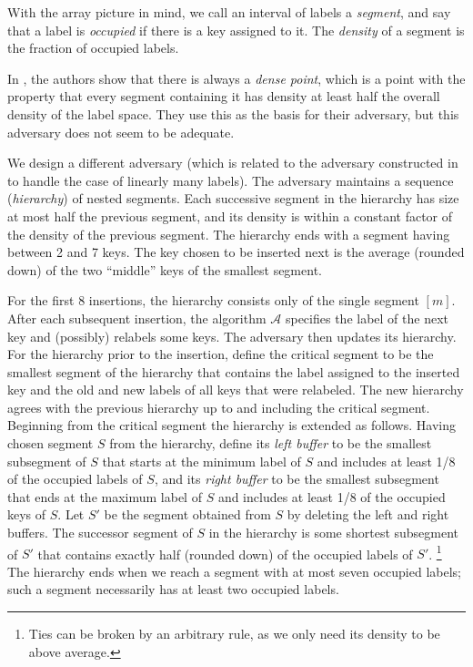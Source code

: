 \documentclass[11pt]{article}
\newcommand{\A}{\mathcal{A}}
\begin{document}
With the array picture in mind,
we  call an interval of labels a \emph{segment}, and say that a label is {\em occupied} if there is a key assigned to it.
The \emph{density} of a segment is the fraction of occupied labels.

In \cite{DSZ04}, the authors show that there is always a \emph{dense point}, which is
a point  with the property that every segment containing it
has density at least half the overall density of the label space.  They use this as the basis for their
adversary, but this adversary does not seem to be adequate.

We design a different adversary (which is related to the adversary constructed in \cite{BKS} to handle
the case of linearly many labels).
The adversary maintains a sequence (\emph{hierarchy}) of nested segments.  Each successive segment in the hierarchy
has size at most half the previous segment, and its density  is within a constant factor of the density of the previous segment.
The hierarchy ends with a segment having between 2 and 7 keys.
 The key chosen to be inserted next is the average (rounded down) of the two ``middle'' keys of the smallest segment.

For the first 8 insertions, the hierarchy consists only of the single segment $[m]$.
After each subsequent insertion,
the algorithm $\A$ specifies the label of the next key and (possibly) relabels some keys. The adversary then updates
its hierarchy.  For the hierarchy prior to the insertion, define the critical segment to be the smallest segment
of the hierarchy that contains the label assigned to the inserted key and the old and new labels
of all keys that were relabeled.  The new hierarchy agrees with the previous hierarchy up to and including
the critical segment.   Beginning from the critical segment the hierarchy is extended as follows.
Having chosen segment $S$ from the hierarchy, define its
{\em left buffer}
to be the smallest subsegment of $S$ that starts at the minimum label of $S$ and
includes at least 1/8 of the occupied labels of $S$, and its {\em right buffer} to be the smallest subsegment that ends at the maximum label of $S$
and includes at least 1/8 of the occupied keys of $S$.
Let $S'$ be the segment obtained from $S$ by
deleting the left and right buffers. The successor segment of $S$ in the hierarchy is
some shortest subsegment of $S'$ that contains exactly half (rounded down) of the occupied labels of $S'$.%
\footnote{Ties can be broken by an arbitrary rule, as we only need its density to be above average.}
The hierarchy ends when we reach a segment with at most seven occupied labels; such a segment necessarily has at least two occupied
labels.
\end{document}
